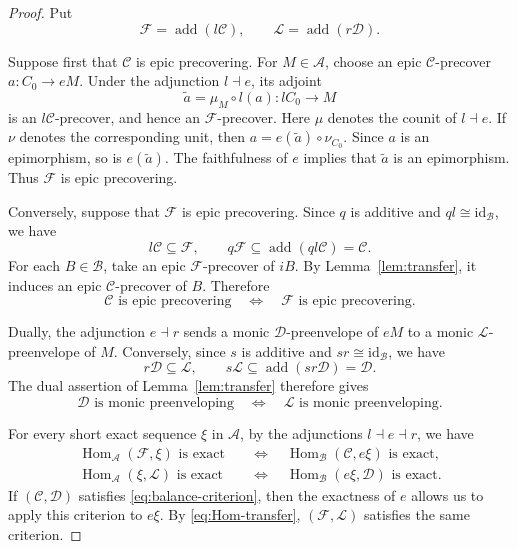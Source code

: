 \documentclass[11pt]{amsart}
\theoremstyle{definition}
\theoremstyle{remark}
\theoremstyle{plain}
\numberwithin{equation}{section}
\begin{document}
\begin{proof}
	Put
	\[
	\mathcal{F}=\operatorname{add}(l\mathcal{C}),
	\qquad
	\mathcal{L}=\operatorname{add}(r\mathcal{D}).
	\]
	
	Suppose first that $\mathcal{C}$ is epic precovering. For $M\in\mathcal{A}$, choose an epic $\mathcal{C}$-precover $a:C_0\to eM$. Under the adjunction $l\dashv e$, its adjoint
	\[
	\widetilde a=\mu_M\circ l(a):lC_0\to M
	\]
	is an $l\mathcal{C}$-precover, and hence an
	$\mathcal{F}$-precover. Here $\mu$ denotes the counit of $l\dashv e$. If $\nu$ denotes the corresponding unit, then
	$a=e(\widetilde a)\circ\nu_{C_0}$.
	Since $a$ is an epimorphism, so is $e(\widetilde a)$. The faithfulness of $e$ implies that $\widetilde a$ is an epimorphism. Thus $\mathcal{F}$ is epic precovering.
	
	Conversely, suppose that $\mathcal{F}$ is epic precovering. Since $q$ is additive and $ql\cong\mathrm{id}_{\mathcal{B}}$, we have
	\[
	l\mathcal{C}\subseteq\mathcal{F},
	\qquad
	q\mathcal{F}\subseteq
	\operatorname{add}(ql\mathcal{C})=\mathcal{C}.
	\]
	For each $B\in\mathcal{B}$, take an epic
	$\mathcal{F}$-precover of $iB$. By
	Lemma~\ref{lem:transfer}, it induces an epic
	$\mathcal{C}$-precover of $B$. Therefore
	\begin{equation}\label{eq:precover-transfer}
		\mathcal{C}\text{ is epic precovering}
		\quad\Longleftrightarrow\quad
		\mathcal{F}\text{ is epic precovering}.
	\end{equation}
	
	Dually, the adjunction $e\dashv r$ sends a monic $\mathcal{D}$-preenvelope of $eM$ to a monic $\mathcal{L}$-preenvelope of $M$.
	Conversely, since $s$ is additive and
	$sr\cong\mathrm{id}_{\mathcal{B}}$, we have
	\[
	r\mathcal{D}\subseteq\mathcal{L},
	\qquad
	s\mathcal{L}\subseteq
	\operatorname{add}(sr\mathcal{D})=\mathcal{D}.
	\]
	The dual assertion of Lemma~\ref{lem:transfer} therefore gives
	\begin{equation}\label{eq:preenvelop-transfer}
		\mathcal{D}\text{ is monic preenveloping}
		\quad\Longleftrightarrow\quad
		\mathcal{L}\text{ is monic preenveloping}.
	\end{equation}
	
	For every short exact sequence $\xi$ in $\mathcal{A}$, by the adjunctions $l\dashv e\dashv r$, we have
	\begin{equation}\label{eq:Hom-transfer}
		\begin{aligned}
			\operatorname{Hom}_{\mathcal{A}}(\mathcal{F},\xi)
			\text{ is exact}
			&\quad\Longleftrightarrow\quad
			\operatorname{Hom}_{\mathcal{B}}(\mathcal{C},e\xi)
			\text{ is exact},\\
			\operatorname{Hom}_{\mathcal{A}}(\xi,\mathcal{L})
			\text{ is exact}
			&\quad\Longleftrightarrow\quad
			\operatorname{Hom}_{\mathcal{B}}(e\xi,\mathcal{D})
			\text{ is exact}.
		\end{aligned}
	\end{equation}
	If $(\mathcal{C},\mathcal{D})$ satisfies
	\eqref{eq:balance-criterion}, then the exactness of $e$ allows us to apply this criterion to $e\xi$. By \eqref{eq:Hom-transfer}, $(\mathcal{F},\mathcal{L})$ satisfies the same criterion.
	

\end{proof}
\end{document}
